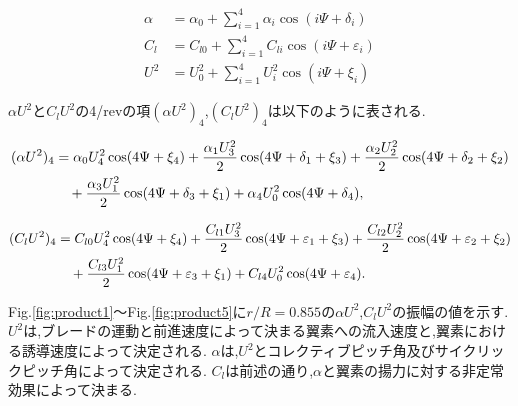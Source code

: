     \begin{align}
    \alpha &= \alpha_0 + \sum_{i=1}^{4} \alpha_i \cos(i\Psi + \delta_i)  \label{eq:alpha_def} \\
    C_l &= C_{l0} + \sum_{i=1}^{4} C_{li} \cos(i\Psi + \varepsilon_i)  \label{eq:cl_def} \\
    U^2 &= U_0^2 + \sum_{i=1}^{4} U_i^2 \cos(i\Psi + \xi_i)  \label{eq:u2_def}
    \end{align}

    $\alpha U^2$と$C_l U^2$の4/revの項$(\alpha U^2)_4$,$(C_l U^2)_4$は以下のように表される.


    \begin{align}
    (\alpha U^2)_4
    &= \alpha_0 U_4^2 \cos(4\Psi + \xi_4)
    + \frac{\alpha_1 U_3^2}{2} \cos(4\Psi + \delta_1 + \xi_3)
    + \frac{\alpha_2 U_2^2}{2} \cos(4\Psi + \delta_2 + \xi_2) \notag \\
    &\quad
    + \frac{\alpha_3 U_1^2}{2} \cos(4\Psi + \delta_3 + \xi_1)
    + \alpha_4 U_0^2 \cos(4\Psi + \delta_4),
    \end{align}
 

    \begin{align}
    (C_l U^2)_4
    &= C_{l0} U_4^2 \cos(4\Psi + \xi_4)
    + \frac{C_{l1} U_3^2}{2} \cos(4\Psi + \varepsilon_1 + \xi_3)
    + \frac{C_{l2} U_2^2}{2} \cos(4\Psi + \varepsilon_2 + \xi_2) \notag \\
    &\quad
    + \frac{C_{l3} U_1^2}{2} \cos(4\Psi + \varepsilon_3 + \xi_1)
    + C_{l4} U_0^2 \cos(4\Psi + \varepsilon_4).
    \end{align}

    \par
    Fig.\ref{fig:product1}～Fig.\ref{fig:product5}に$r/R= 0.855$の$\alpha U^2$,$C_l U^2$の振幅の値を示す.
    $U^2$は,ブレードの運動と前進速度によって決まる翼素への流入速度と,翼素における誘導速度によって決定される.
    $\alpha$は,$U^2$とコレクティブピッチ角及びサイクリックピッチ角によって決定される.
    $C_l$は前述の通り,$\alpha$と翼素の揚力に対する非定常効果によって決まる.

